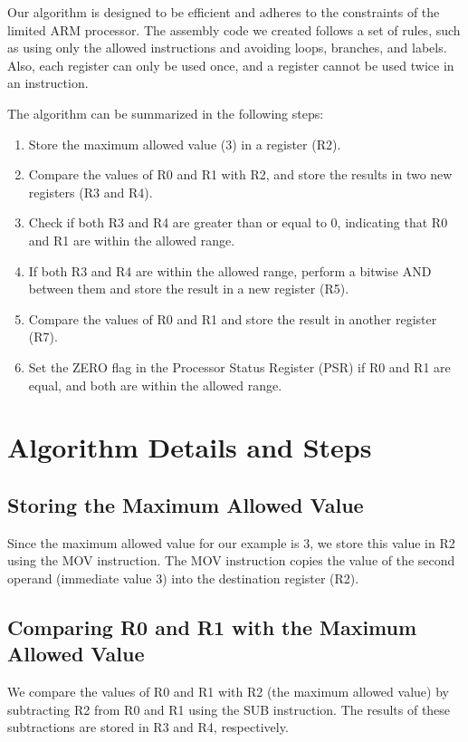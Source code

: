Our algorithm is designed to be efficient and adheres to the constraints of the limited ARM processor. The assembly code we created follows a set of rules, such as using only the allowed instructions and avoiding loops, branches, and labels. Also, each register can only be used once, and a register cannot be used twice in an instruction.

The algorithm can be summarized in the following steps:

\begin{enumerate}
    \item Store the maximum allowed value (3) in a register (R2).
    \item Compare the values of R0 and R1 with R2, and store the results in two new registers (R3 and R4).
    \item Check if both R3 and R4 are greater than or equal to 0, indicating that R0 and R1 are within the allowed range.
    \item If both R3 and R4 are within the allowed range, perform a bitwise AND between them and store the result in a new register (R5).
    \item Compare the values of R0 and R1 and store the result in another register (R7).
    \item Set the ZERO flag in the Processor Status Register (PSR) if R0 and R1 are equal, and both are within the allowed range.
\end{enumerate}

\section{Algorithm Details and Steps}

\subsection{Storing the Maximum Allowed Value}

Since the maximum allowed value for our example is 3, we store this value in R2 using the MOV instruction. The MOV instruction copies the value of the second operand (immediate value 3) into the destination register (R2).

\subsection{Comparing R0 and R1 with the Maximum Allowed Value}

We compare the values of R0 and R1 with R2 (the maximum allowed value) by subtracting R2 from R0 and R1 using the SUB instruction. The results of these subtractions are stored in R3 and R4, respectively.

